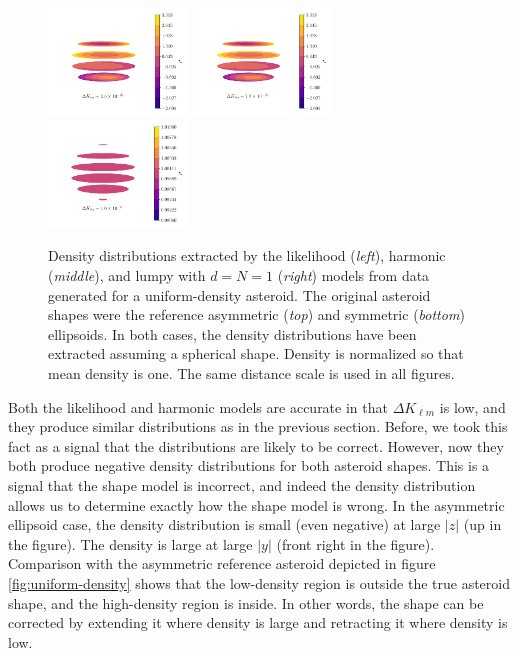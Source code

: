 \documentclass[fleqn,usenatbib]{mnras}
\begin{document}
\begin{figure}
  \includegraphics[width=0.33\textwidth]{figs/sym-sph-likelihood.pdf}\hfill
  \includegraphics[width=0.33\textwidth]{figs/sym-sph-harmonic.pdf}\hfill
  \includegraphics[width=0.33\textwidth]{figs/sym-sph-lumpy.pdf}\

  \caption{Density distributions extracted by the likelihood (\textit{left}), harmonic (\textit{middle}), and lumpy with $d=N=1$ (\textit{right}) models from data generated for a uniform-density asteroid. The original asteroid shapes were the reference asymmetric (\textit{top}) and symmetric (\textit{bottom}) ellipsoids. In both cases, the density distributions have been extracted assuming a spherical shape. Density is normalized so that mean density is one. The same distance scale is used in all figures.}
  \label{fig:sphere-density}
\end{figure}

Both the likelihood and harmonic models are accurate in that $\Delta K_{\ell m}$ is low, and they produce similar distributions as in the previous section. Before, we took this fact as a signal that the distributions are likely to be correct. However, now they both produce negative density distributions for both asteroid shapes. This is a signal that the shape model is incorrect, and indeed the density distribution allows us to determine exactly how the shape model is wrong. In the asymmetric ellipsoid case, the density distribution is small (even negative) at large $|z|$ (up in the figure). The density is large at large $|y|$ (front right in the figure). Comparison with the asymmetric reference asteroid depicted in figure \ref{fig:uniform-density} shows that the low-density region is outside the true asteroid shape, and the high-density region is inside. In other words, the shape can be corrected by extending it where density is large and retracting it where density is low.
\end{document}
